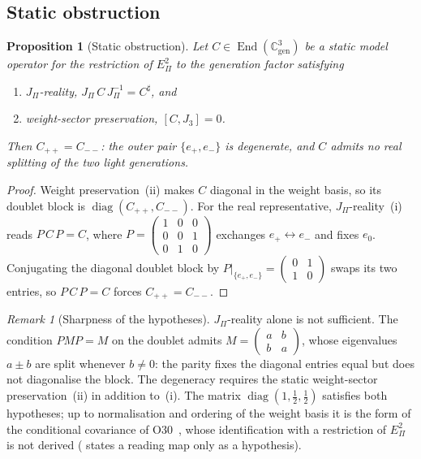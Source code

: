 \documentclass[11pt,a4paper]{article}
\newtheorem{proposition}[theorem]{Proposition}
\theoremstyle{definition}
\theoremstyle{remark}
\newtheorem{remark}[theorem]{Remark}
\DeclareMathOperator{\End}{End}
\begin{document}
  \subsection{Static obstruction}
    \label{ssec:dg-static}

    \begin{proposition}[Static obstruction]
      \label{prop:dg-static}
      Let $C \in \End(\mathbb{C}^3_{\mathrm{gen}})$ be a static model operator for the restriction of
      $E_\Pi^2$ to the
      generation factor satisfying
      \begin{enumerate}
        \item[\emph{(i)}]  $J_\Pi$-reality, $J_\Pi\, C\, J_\Pi^{-1} = C^{\sharp}$, and
        \item[\emph{(ii)}] weight-sector preservation, $[C, J_3] = 0$.
      \end{enumerate}
      Then $C_{++} = C_{--}$: the outer pair $\{e_+, e_-\}$ is degenerate, and $C$ admits no real
      splitting of the two light generations.
    \end{proposition}

    \begin{proof}
      Weight preservation~(ii) makes $C$ diagonal in the weight basis, so its doublet block is
      $\operatorname{diag}(C_{++}, C_{--})$.
      For the real representative, $J_\Pi$-reality~(i) reads $P\, C\, P = C$, where
      $P = \left(\begin{smallmatrix} 1 & 0 & 0 \\ 0 & 0 & 1 \\ 0 & 1 & 0 \end{smallmatrix}\right)$
      exchanges $e_+ \leftrightarrow e_-$ and fixes $e_0$.
      Conjugating the diagonal doublet block by
      $P|_{\{e_+,e_-\}} = \left(\begin{smallmatrix} 0 & 1 \\ 1 & 0 \end{smallmatrix}\right)$ swaps
      its two entries, so $P\,C\,P = C$ forces $C_{++} = C_{--}$.
    \end{proof}

    \begin{remark}[Sharpness of the hypotheses]
      \label{rem:dg-sharpness}
      $J_\Pi$-reality alone is not sufficient.
      The condition $P M P = M$ on the doublet admits
      $M = \left(\begin{smallmatrix} a & b \\ b & a \end{smallmatrix}\right)$, whose eigenvalues
      $a \pm b$ are split whenever $b \neq 0$: the parity fixes the diagonal entries equal but does
      not diagonalise the block.
      The degeneracy requires the static weight-sector preservation~(ii) in addition to~(i).
      The matrix $\operatorname{diag}(1, \tfrac12, \tfrac12)$ satisfies both hypotheses; up to
      normalisation and ordering of the weight basis it is the form of the conditional covariance of
      O30~\cite{Beau2026a34}, whose identification with a restriction of $E_\Pi^2$ is not
      derived (\cite{Beau2026prs} states a reading map only as a hypothesis).
    \end{remark}
\end{document}
